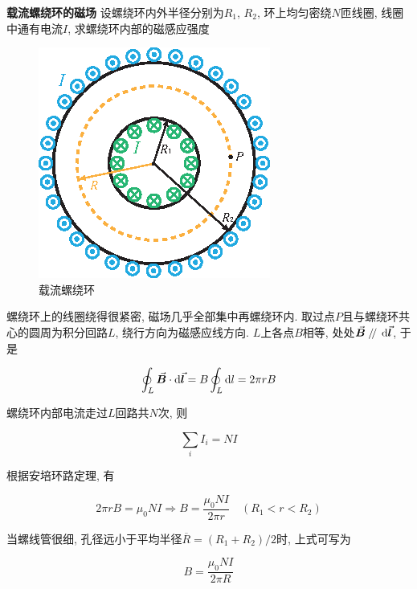 \begin{example}
	\textbf{载流螺绕环的磁场} \quad 设螺绕环内外半径分别为$R_1$, $R_2$, 环上均匀密绕$N$匝线圈, 线圈中通有电流$I$, 求螺绕环内部的磁感应强度
	
	\begin{figure}[H]
		\centering
		\includegraphics[scale=1.0]{C8-fig10.eps}
		\caption{载流螺绕环}
	\end{figure}
	
	\begin{solution}
		
		螺绕环上的线圈绕得很紧密, 磁场几乎全部集中再螺绕环内. 取过点$P$且与螺绕环共心的圆周为积分回路$L$, 绕行方向为磁感应线方向. $L$上各点$B$相等, 处处$\va*{B} \kern 0.56em/\kern -0.8em /\kern 0.56em \dd{\va*{l}}$, 于是
		
		\begin{equation*}
			\oint_{L} \va*{B} \cdot \dd{\va*{l}} = B \oint_{L} \dd{l} = 2 \pi r B
		\end{equation*}

		螺绕环内部电流走过$L$回路共$N$次, 则
		
		\begin{equation*}
			\sum\limits_{i} I_i = N I
		\end{equation*}
		
		根据安培环路定理, 有
		
		\begin{equation*}
			2 \pi r B = \mu_0 N I \Rightarrow B = \dfrac{\mu_0 N I}{2 \pi r} \quad (R_1 < r < R_2)
		\end{equation*}
		
		当螺线管很细, 孔径远小于平均半径$\overline{R} = (R_1 + R_2) / 2$时, 上式可写为
		
		\begin{equation*}
			B = \dfrac{\mu_0 N I}{2 \pi R}
		\end{equation*}
		
	\end{solution}
	
\end{example}

